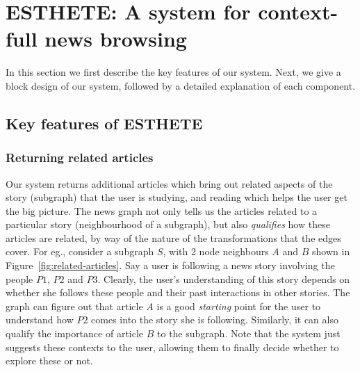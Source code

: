 \section{ESTHETE: A system for context-full news browsing }

In this section we first describe the key features of our system. Next, we give a block design of our system, followed by a detailed explanation
of each component. 

\subsection{Key features of ESTHETE}

\subsubsection{Returning related articles}
Our system returns additional articles which bring out related aspects of the story (subgraph) that the user is studying, and reading which helps
the user get the big picture. The news graph not only tells us the articles related to a particular story (neighbourhood of a subgraph), but
also \emph{qualifies} how these articles are related, by way of the nature of the transformations that the edges cover. For eg., consider a subgraph $S$, with
2 node neighbours $A$ and $B$ shown in Figure~\ref{fig:related-articles}. Say a user is following a news story involving the people $P1$, $P2$ and
$P3$. Clearly, the user's understanding of this story depends on whether she follows these people and their past interactions in other stories.
The graph can figure out that article $A$ is a good \emph{starting} point for the user to understand how $P2$ comes into the story she is
following. Similarly, it can also qualify the importance of article $B$ to the subgraph. Note that the system just suggests these contexts to the user, allowing them to finally decide whether to explore these or not. 

